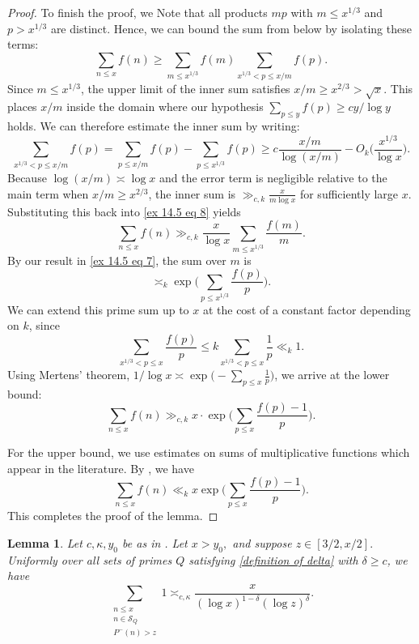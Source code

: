 \documentclass{amsart}
\newtheorem{lemma}[theorem]{Lemma}
\theoremstyle{definition}
\numberwithin{equation}{section}
\renewcommand{\S}{\mathcal{S}}
\newcommand{\density}{\delta}
\begin{document}
\begin{proof}
		To finish the proof, we Note that all products $mp$ with $m\le x^{1/3}$ and $p>x^{1/3}$ are distinct. Hence, we can bound the sum from below by isolating these terms:
		\begin{equation}\label{ex 14.5 eq 8}
			\sum_{n \leq x}f(n) \geq \sum_{m \leq x^{1/3}} f(m) \sum_{x^{1/3} < p \leq x/m} f(p).
		\end{equation}
		Since $m \leq x^{1/3}$, the upper limit of the inner sum satisfies $x/m \geq x^{2/3} > \sqrt{x}$. This places $x/m$ inside the domain where our hypothesis $\sum_{p \leq y} f(p) \geq c y/\log y$ holds. We can therefore estimate the inner sum by writing:
		\begin{equation*}
			\sum_{x^{1/3} < p \leq x/m} f(p) = \sum_{p \leq x/m} f(p) - \sum_{p \leq x^{1/3}} f(p) \geq c \frac{x/m}{\log(x/m)} - O_k\bigg(\frac{x^{1/3}}{\log x}\bigg).
		\end{equation*}
		Because $\log(x/m) \asymp \log x$ and the error term is negligible relative to the main term when $x/m \geq x^{2/3}$, the inner sum is $\gg_{c,k} \frac{x}{m \log x}$ for sufficiently large $x$. Substituting this back into \eqref{ex 14.5 eq 8} yields
		\begin{equation*}
			\sum_{n \leq x} f(n) \gg_{c,k} \frac{x}{\log x} \sum_{m \leq x^{1/3}} \frac{f(m)}{m}.
		\end{equation*}
		By our result in \eqref{ex 14.5 eq 7}, the sum over $m$ is $$\asymp_k \exp\Big(\sum_{p \leq x^{1/3}} \frac{f(p)}{p}\Big).$$ We can extend this prime sum up to $x$ at the cost of a constant factor depending on $k$, since $$\sum_{x^{1/3} < p \leq x} \frac{f(p)}{p} \leq k \sum_{x^{1/3} < p \leq x} \frac{1}{p} \ll_k 1.$$ Using Mertens' theorem, $1/\log x \asymp \exp\big(-\sum_{p \leq x} \frac{1}{p}\big)$, we arrive at the lower bound:
		\begin{equation}\label{ex 14.5 eq 9}
			\sum_{n \leq x} f(n) \gg_{c,k} x \cdot \exp\bigg(\sum_{p \leq x} \frac{f(p)-1}{p}\bigg).
		\end{equation}
		
		For the upper bound, we use estimates on sums of multiplicative functions which appear in the literature. By \cite[{Theorem 14.2}]{koukoulopoulos2019distribution}, we have $$\sum_{n \leq x} f(n) \ll_k x \exp \bigg(\sum_{p \leq x} \frac{f(p) - 1}{p}\bigg).$$
		This completes the proof of the lemma.
	\end{proof}
	\begin{lemma}\label{count s P-}
		Let $c,\kappa,y_0$ be as in . Let $x > y_0,$ and suppose $z \in [3/2,x/2].$  Uniformly over all sets of primes $Q$ satisfying \eqref{definition of delta} with $\density \ge c$, we have 
		$$\sum_{\substack{n \leq x\\ n \in \S_Q \\ P^-(n) > z}}1 \asymp_{c,\kappa} \frac{x}{(\log x)^{1-\density}(\log z)^\density}.$$
	\end{lemma}
\end{document}
